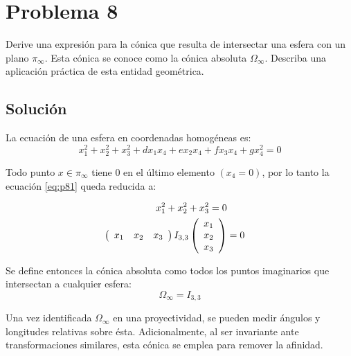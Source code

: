\section*{Problema 8}
\setcounter{equation}{0}
Derive una expresión para la cónica que resulta de intersectar una esfera con un plano 
$\pi_\infty$. Esta cónica se conoce como la cónica absoluta $\Omega_\infty$. 
Describa una aplicación práctica de esta entidad geométrica.

\subsection*{Solución}
La ecuación de una esfera en coordenadas homogéneas es:
\begin{equation}
x_1^2 + x_2^2 + x_3^2 + d x_1 x_4 + e x_2 x_4 + f x_3 x_4 + g x_4^2 = 0
\label{eq:p81}
\end{equation} 

Todo punto $x \in \pi_\infty$ tiene 0 en el último elemento $(x_4=0)$, por lo tanto
la ecuación \ref{eq:p81} queda reducida a:

\begin{align*}
x_1^2 + x_2^2 + x_3^2 = 0 \\
\left(
\begin{array}{c c c}
  x_1 & x_2 & x_3
\end{array}
\right) 
I_{3,3} 
\left(
\begin{array}{c}
    x_1 \\ 
    x_2 \\
    x_3
\end{array}
\right) 
&= 0 
\end{align*} 

Se define entonces la cónica absoluta como todos los puntos imaginarios que
intersectan a cualquier esfera:
\begin{equation*}
\Omega_\infty = I_{3,3}
\end{equation*} 

Una vez identificada $\Omega_\infty$ en una proyectividad, se pueden medir ángulos y
longitudes relativas sobre ésta. Adicionalmente, al ser invariante ante transformaciones
similares, esta cónica se emplea para remover la afinidad.
